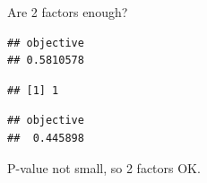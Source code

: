 \documentclass[
  ignorenonframetext,
]{beamer}
\newenvironment{Shaded}{\begin{snugshade}}{\end{snugshade}}
\newcommand{\NormalTok}[1]{#1}
\newcommand{\OperatorTok}[1]{\textcolor[rgb]{0.81,0.36,0.00}{\textbf{#1}}}
\begin{document}
\begin{frame}[fragile]{Are 2 factors enough?}
\protect\hypertarget{are-2-factors-enough}{}

\begin{Shaded}
\end{Shaded}

\begin{verbatim}
## objective 
## 0.5810578
\end{verbatim}

\begin{Shaded}
\end{Shaded}

\begin{verbatim}
## [1] 1
\end{verbatim}

\begin{Shaded}
\end{Shaded}

\begin{verbatim}
## objective 
##  0.445898
\end{verbatim}

P-value not small, so 2 factors OK.

\end{frame}
\end{document}
